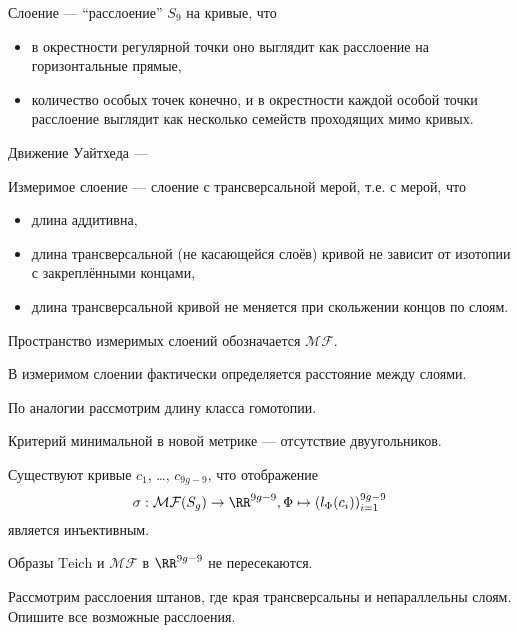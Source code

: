 \documentclass[12pt,a4paper]{article}
\newcommand{\Teich}{\mathrm{Teich}}
\newcommand{\MF}{\mathcal{MF}}
\begin{document}
    \begin{definition}
        Слоение --- ``расслоение'' $S_9$ на кривые, что
        \begin{itemize}
            \item в окрестности регулярной точки оно выглядит как расслоение на горизонтальные прямые,
            \item количество особых точек конечно, и в окрестности каждой особой точки расслоение выглядит как несколько семейств проходящих мимо кривых.
        \end{itemize}

        Движение Уайтхеда --- 

        Измеримое слоение --- слоение с трансверсальной мерой, т.е. с мерой, что
        \begin{itemize}
            \item длина аддитивна,
            \item длина трансверсальной (не касающейся слоёв) кривой не зависит от изотопии с закреплёнными концами,
            \item длина трансверсальной кривой не меняется при скольжении концов по слоям.
        \end{itemize}

        Пространство измеримых слоений обозначается $\MF$.
    \end{definition}

    \begin{remark}
        В измеримом слоении фактически определяется расстояние между слоями.
    \end{remark}

    По аналогии рассмотрим длину класса гомотопии.

    \begin{lemma}
        Критерий минимальной в новой метрике --- отсутствие двуугольников.
    \end{lemma}

    \begin{theorem}
        Существуют кривые $c_1$, \dots, $c_{9g-9}$, что отображение
        \[\sigma: \MF(S_g) \to \RR^{9g-9}, \Phi \mapsto (l_\Phi(c_i))_{i=1}^{9g-9}\]
        является инъективным. 
    \end{theorem}

    \begin{lemma}
        Образы $\Teich$ и $\MF$ в $\RR^{9g-9}$ не пересекаются.
    \end{lemma}

    \begin{problem}
        Рассмотрим расслоения штанов, где края трансверсальны и непараллельны слоям. Опишите все возможные расслоения.
    \end{problem}
\end{document}
